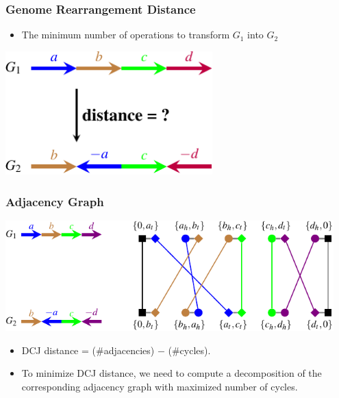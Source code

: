 \frame
{
	\frametitle{Genome Rearrangement Distance}
	\begin{itemize}
	\item The minimum number of operations to transform $G_1$ into $G_2$
	\end{itemize}

	\vspace{0.2cm}

	\begin{center}
		\includegraphics[width=0.6\textwidth]{Lec8-Genome-Rearrangement-Problem-figs/distance.pdf}
	\end{center}
}

\frame
{
	\frametitle{Adjacency Graph}
	\begin{center}
		\includegraphics[width=0.95\textwidth]{Lec8-Genome-Rearrangement-Problem-figs/adjgraph.pdf}
	\end{center}
	\begin{itemize}
	\item<2-> DCJ distance = (\#adjacencies) $-$ (\#cycles).
	\item<3-> To minimize DCJ distance, we need to compute a decomposition of the corresponding
		adjacency graph with maximized number of cycles.
	\end{itemize}
}

